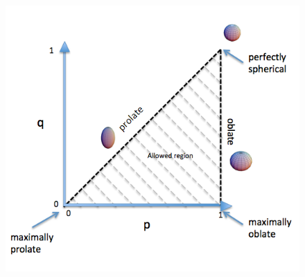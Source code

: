 \documentclass[hyperref={pdfpagelabels=false}]{beamer}
\begin{document}
\begin{frame}
\begin{columns}
\begin{column}{0.5\textwidth}
\begin{figure}
      \includegraphics[width=\textwidth]{pqspace_schema.png}
    \end{figure}  
  \end{column}
\end{columns}
\end{frame}
\end{document}
